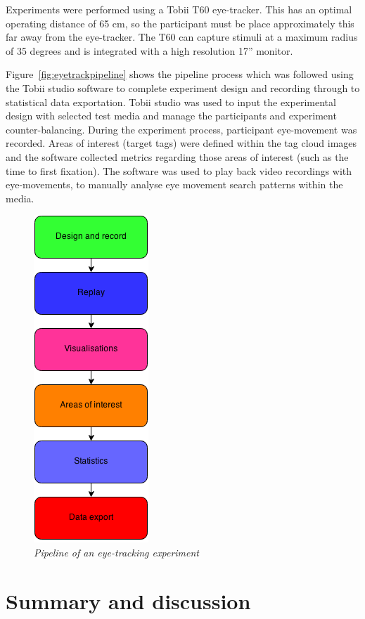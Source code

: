 Experiments were performed using a Tobii T60 eye-tracker. This has an optimal operating distance of 65 cm, so the participant must be place approximately this far away from the eye-tracker. The T60 can capture stimuli at a maximum radius of 35 degrees and is integrated with a high resolution 17'' monitor. 

Figure~\vref{fig:eyetrackpipeline} shows the pipeline process which was followed using the Tobii studio software to complete experiment design and recording through to statistical data exportation. Tobii studio was used to input the experimental design with selected test media and manage the participants and experiment counter-balancing. During the experiment process, participant eye-movement was recorded. Areas of interest (target tags) were defined within the tag cloud images and the software collected metrics regarding those areas of interest (such as the time to first fixation). The software was used to play back video recordings with eye-movements, to manually analyse eye movement search patterns within the media.

\begin{figure}[!htb]
   	\centering
  	\includegraphics[scale=0.60]{pipeline.png}	
	\caption{\textit{Pipeline of an eye-tracking experiment}}
	\label{fig:eyetrackpipeline}
\end{figure}

\section{Summary and discussion}

